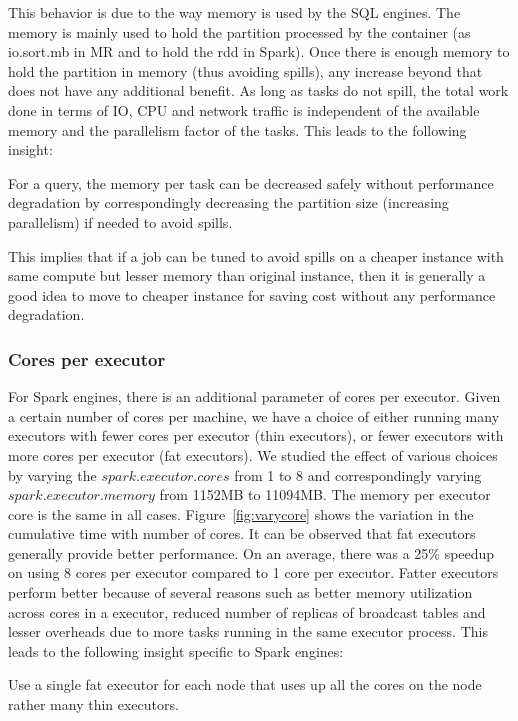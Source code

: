 This behavior is due to the way memory is used by the SQL engines. The memory is mainly used to hold the partition processed by the container (as io.sort.mb in MR and to hold the rdd in Spark). Once there is enough memory to hold the partition in memory (thus avoiding spills), any increase beyond that does not have any additional benefit.
As long as tasks do not spill, the total work done in terms of IO, CPU and network traffic is independent of the available memory and the parallelism factor of the tasks. This leads to the following insight:
\begin{insight}
	For a query, the memory per task can be decreased safely without performance degradation by correspondingly decreasing the partition size (increasing parallelism) if needed to avoid spills.
\end{insight}
This implies that 
if a job can be tuned to avoid spills on a cheaper instance with same compute but lesser memory than original instance, then it is generally a good idea to move to cheaper instance for saving cost without any performance degradation.

\subsubsection*{Cores per executor}
For Spark engines, there is an additional parameter of cores per executor. Given a certain number of cores per machine, we have a choice of either running many executors with fewer cores per executor (thin executors), or fewer executors with more cores per executor (fat executors). We studied the effect of various choices by varying the $spark.executor.cores$ from 1 to 8 and correspondingly varying $spark.executor.memory$ from 1152MB to 11094MB. The memory per executor core is the same in all cases. Figure~\ref{fig:varycore} shows the variation in the cumulative time with number of cores. It can be observed that fat executors generally provide better performance. On an average, there was a 25\% speedup on using 8 cores per executor compared to 1 core per executor. Fatter executors perform better because of several reasons such as  better memory utilization across cores in a executor, reduced number of replicas of broadcast tables and lesser overheads due to more tasks running in the same executor process. This leads to the following insight specific to Spark engines:
\begin{insight}
	Use a single fat executor for each node that uses up all the cores on the node rather many thin executors.
\end{insight}

